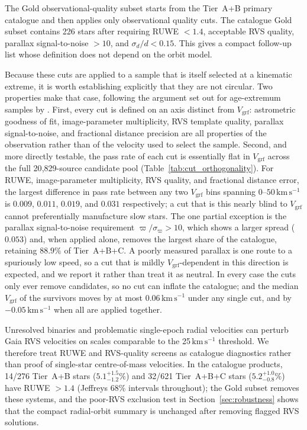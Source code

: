 \documentclass{aa}  %
\newcommand{\vgrf}{\ensuremath{V_{\mathrm{grf}}}\xspace}
\newcommand{\kms}{\ensuremath{\,\mathrm{km\,s^{-1}}}\xspace}
\begin{document}
The Gold observational-quality subset starts from the Tier~A+B primary catalogue
and then applies only observational quality cuts.  The catalogue
Gold subset contains 226 stars after requiring RUWE $<1.4$, acceptable
RVS quality, parallax signal-to-noise $>10$, and $\sigma_d/d<0.15$.
This gives a compact follow-up list whose definition does not depend on
the orbit model.

Because these cuts are applied to a sample that is itself selected at a
kinematic extreme, it is worth establishing explicitly that they are not
circular.  Two properties make that case, following the argument set out
for age-extremum samples by \citet{Banik2026}.  First, every cut is
defined on an axis distinct from \vgrf{}: astrometric goodness of fit,
image-parameter multiplicity, RVS template quality, parallax
signal-to-noise, and fractional distance precision are all properties of
the observation rather than of the velocity used to select the sample.
Second, and more directly testable, the pass rate of each cut is
essentially flat in \vgrf{} across the full 20{,}829-source candidate
pool (Table~\ref{tab:cut_orthogonality}).  For RUWE, image-parameter
multiplicity, RVS quality, and fractional distance error, the largest
difference in pass rate between any two \vgrf{} bins spanning
$0$--$50\kms$ is $0.009$, $0.011$, $0.019$, and $0.031$ respectively;
a cut that is this nearly blind to \vgrf{} cannot preferentially
manufacture slow stars.  The one partial exception is the parallax
signal-to-noise requirement $\varpi/\sigma_\varpi>10$, which shows a
larger spread ($0.053$) and, when applied alone, removes the largest
share of the catalogue, retaining $88.9\%$ of Tier~A+B+C.  A poorly
measured parallax is one route to a spuriously low speed, so a cut that
is mildly \vgrf{}-dependent in this direction is expected, and we report
it rather than treat it as neutral.  In every case the cuts only ever
remove candidates, so no cut can inflate the catalogue; and the median
\vgrf{} of the survivors moves by at most $0.06\kms$ under any single
cut, and by $-0.05\kms$ when all are applied together.

Unresolved binaries and problematic single-epoch radial velocities can
perturb Gaia RVS velocities on scales comparable to the 25\kms{}
threshold.  We therefore treat RUWE and RVS-quality screens as catalogue
diagnostics rather than proof of single-star centre-of-mass velocities.
In the catalogue products, 14/276 Tier~A+B stars
($5.1^{+1.5}_{-1.2}\%$) and 32/621 Tier~A+B+C stars
($5.2^{+1.0}_{-0.8}\%$) have RUWE $>1.4$ (Jeffreys 68\% intervals throughout);
the Gold subset removes these systems, and the poor-RVS exclusion test
in Section~\ref{sec:robustness} shows that the compact radial-orbit
summary is unchanged after removing flagged RVS solutions.
\end{document}
